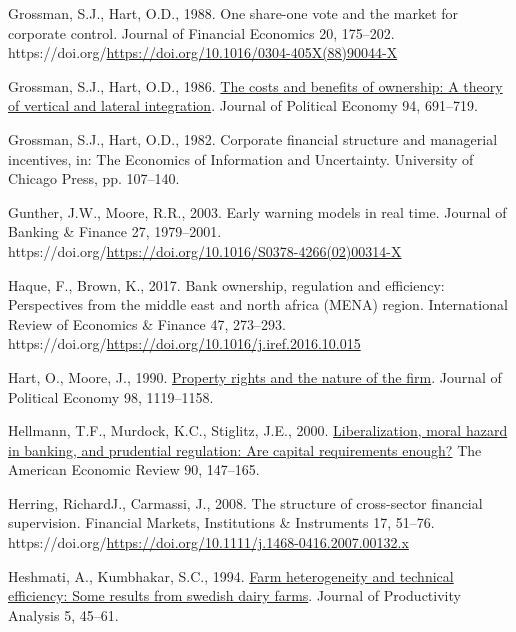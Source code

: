 \documentclass[
  12pt,
  a4paper,
  DIV=11,
  numbers=noendperiod]{scrreprt}
\newlength{\cslhangindent}
\newenvironment{CSLReferences}[2] %
 {\begin{list}{}{%
  \setlength{\itemindent}{0pt}
  \setlength{\leftmargin}{0pt}
  \setlength{\parsep}{0pt}
  \ifodd #1
   \setlength{\leftmargin}{\cslhangindent}
   \setlength{\itemindent}{-1\cslhangindent}
  \fi
  \setlength{\itemsep}{#2\baselineskip}}}
 {\end{list}}
\begin{document}
\begin{CSLReferences}{1}{0}
Grossman, S.J., Hart, O.D., 1988. One share-one vote and the market for
corporate control. Journal of Financial Economics 20, 175--202.
https://doi.org/\url{https://doi.org/10.1016/0304-405X(88)90044-X}

Grossman, S.J., Hart, O.D., 1986.
\href{http://www.jstor.org/stable/1833199}{The costs and benefits of
ownership: A theory of vertical and lateral integration}. Journal of
Political Economy 94, 691--719.

Grossman, S.J., Hart, O.D., 1982. Corporate financial structure and
managerial incentives, in: The Economics of Information and Uncertainty.
University of Chicago Press, pp. 107--140.

Gunther, J.W., Moore, R.R., 2003. Early warning models in real time.
Journal of Banking \& Finance 27, 1979--2001.
https://doi.org/\url{https://doi.org/10.1016/S0378-4266(02)00314-X}

Haque, F., Brown, K., 2017. Bank ownership, regulation and efficiency:
Perspectives from the middle east and north africa (MENA) region.
International Review of Economics \& Finance 47, 273--293.
https://doi.org/\url{https://doi.org/10.1016/j.iref.2016.10.015}

Hart, O., Moore, J., 1990.
\href{http://www.jstor.org/stable/2937753}{Property rights and the
nature of the firm}. Journal of Political Economy 98, 1119--1158.

Hellmann, T.F., Murdock, K.C., Stiglitz, J.E., 2000.
\href{http://www.jstor.org.queens.ezp1.qub.ac.uk/stable/117285}{Liberalization,
moral hazard in banking, and prudential regulation: Are capital
requirements enough?} The American Economic Review 90, 147--165.

Herring, RichardJ., Carmassi, J., 2008. The structure of cross-sector
financial supervision. Financial Markets, Institutions \& Instruments
17, 51--76.
https://doi.org/\url{https://doi.org/10.1111/j.1468-0416.2007.00132.x}

Heshmati, A., Kumbhakar, S.C., 1994.
\href{http://www.jstor.org/stable/41769891}{Farm heterogeneity and
technical efficiency: Some results from swedish dairy farms}. Journal of
Productivity Analysis 5, 45--61.


\end{CSLReferences}
\end{document}
